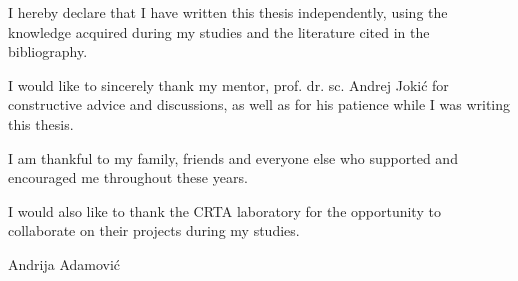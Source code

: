 \documentclass[12pt,a4paper]{report}
\newcommand{\authorname}{Andrija Adamovi\'{c}}
\newcommand{\clearemptypage}{%
    \clearpage
    \thispagestyle{empty}%
}
\begin{document}
\clearemptypage{}
\vspace*{\fill}
\noindent I hereby declare that I have written this thesis independently, using the knowledge
acquired during my studies and the literature cited in the bibliography.

\vspace{8mm}
\quad I would like to sincerely thank my mentor, prof. dr. sc. Andrej Jokić for constructive advice and discussions, as well as for his patience while I was writing this thesis.

\quad I am thankful to my family, friends and everyone else who supported and encouraged me throughout these years.

\quad I would also like to thank the CRTA laboratory for the opportunity to collaborate on their projects during my studies.


\vspace{10mm}
\begin{flushright}
    \authorname{}
\end{flushright}
\vspace*{\fill}
\clearpage



\setcounter{page}{1}
\pagestyle{fancy}
\hypersetup{pageanchor=true}

\tableofcontents
\clearpage

\listoffigures
\clearpage
\end{document}
